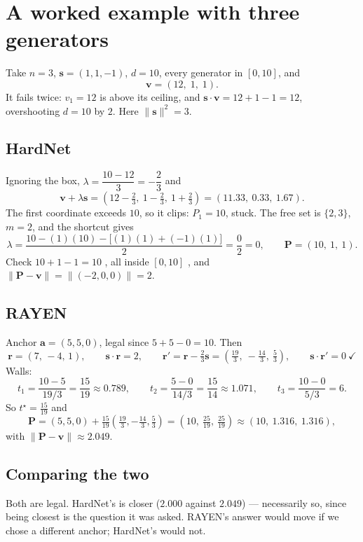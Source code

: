 \documentclass[11pt]{article}
\begin{document}
\section{A worked example with three generators}

Take $n=3$, $\mathbf{s}=(1,1,-1)$, $d=10$, every generator in $[0,10]$, and
\[
\mathbf{v}=(12,\;1,\;1).
\]
It fails twice: $v_1=12$ is above its ceiling, and
$\mathbf{s}\cdot\mathbf{v}=12+1-1=12$, overshooting $d=10$ by $2$. Here
$\|\mathbf{s}\|^{2}=3$.

\subsection*{HardNet}

Ignoring the box, $\lambda = \dfrac{10-12}{3} = -\dfrac{2}{3}$ and
\[
\mathbf{v}+\lambda\mathbf{s} = \left(12-\tfrac23,\ 1-\tfrac23,\ 1+\tfrac23\right)
= (11.33,\ 0.33,\ 1.67).
\]
The first coordinate exceeds $10$, so it clips: $P_1=10$, stuck. The free set is
$\{2,3\}$, $m=2$, and the shortcut gives
\[
\lambda = \frac{10 - (1)(10) - \bigl[(1)(1)+(-1)(1)\bigr]}{2} = \frac{0}{2} = 0,
\qquad
\mathbf{P} = (10,\ 1,\ 1).
\]
Check $10+1-1=10$ \checkmark, all inside $[0,10]$ \checkmark, and
$\|\mathbf{P}-\mathbf{v}\| = \|(-2,0,0)\| = 2$.

\subsection*{RAYEN}

Anchor $\mathbf{a}=(5,5,0)$, legal since $5+5-0=10$. Then
\[
\mathbf{r} = (7,\,-4,\,1), \qquad \mathbf{s}\cdot\mathbf{r} = 2,
\qquad
\mathbf{r}' = \mathbf{r} - \tfrac{2}{3}\mathbf{s}
= \left(\tfrac{19}{3},\ -\tfrac{14}{3},\ \tfrac{5}{3}\right),
\qquad \mathbf{s}\cdot\mathbf{r}' = 0\ \checkmark
\]
Walls:
\[
t_1=\frac{10-5}{19/3}=\frac{15}{19}\approx0.789,
\qquad
t_2=\frac{5-0}{14/3}=\frac{15}{14}\approx1.071,
\qquad
t_3=\frac{10-0}{5/3}=6 .
\]
So $t^\star=\tfrac{15}{19}$ and
\[
\mathbf{P} = (5,5,0)+\tfrac{15}{19}\left(\tfrac{19}{3},-\tfrac{14}{3},\tfrac{5}{3}\right)
= \left(10,\ \tfrac{25}{19},\ \tfrac{25}{19}\right) \approx (10,\ 1.316,\ 1.316),
\]
with $\|\mathbf{P}-\mathbf{v}\|\approx 2.049$.

\subsection*{Comparing the two}

Both are legal. HardNet's is closer ($2.000$ against $2.049$) --- necessarily so,
since being closest is the question it was asked. RAYEN's answer would move if we
chose a different anchor; HardNet's would not.
\end{document}
